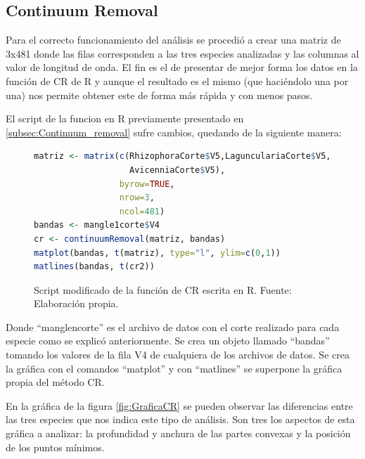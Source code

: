 \subsection{Continuum Removal}

Para el correcto funcionamiento del análisis se procedió a crear una matriz de 3x481 donde las filas corresponden a las tres especies analizadas y las columnas al valor de longitud de onda. El fin es el de presentar de mejor forma los datos en la función de \ac{CR} de R y aunque el resultado es el mismo (que haciéndolo una por una) nos permite obtener este de forma más rápida y con menos pasos.\Sep

El script de la funcion en R previamente presentado en \ref{subsec:Continuum_removal} sufre cambios, quedando de la siguiente manera:\SmallSep

\begin{figure}[ht]
	\centering
	\begin{lstlisting}[language = R, frame = single]
matriz <- matrix(c(RhizophoraCorte$V5,LagunculariaCorte$V5,
                   AvicenniaCorte$V5),
                 byrow=TRUE,
                 nrow=3,
                 ncol=481)
bandas <- mangle1corte$V4
cr <- continuumRemoval(matriz, bandas)
matplot(bandas, t(matriz), type="l", ylim=c(0,1))
matlines(bandas, t(cr2))
	\end{lstlisting}
	\caption[Función modificada de CR]{Script modificado de la función de CR escrita en R. Fuente: Elaboración propia.}
	\label{fig:CRmodificado}
\end{figure}	

Donde ``manglencorte'' es el archivo de datos con el corte realizado para cada especie como se explicó anteriormente. Se crea un objeto llamado ``bandas'' tomando los valores de la fila V4 de cualquiera de los archivos de datos. Se crea la gráfica con el comandos ``matplot'' y con ``matlines'' se superpone la gráfica propia del método \ac{CR}.\Sep

En la gráfica de la figura \ref{fig:GraficaCR} se pueden observar las diferencias entre las tres especies que nos indica este tipo de análisis. Son tres los aspectos de esta gráfica a analizar: la profundidad y anchura de las partes convexas y la posición de los puntos mínimos.\Sep

